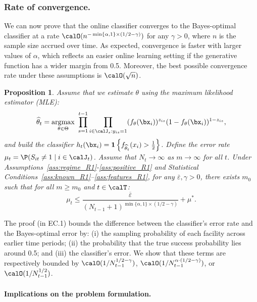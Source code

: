 \documentclass[11pt]{article}
\DeclareMathOperator*{\argmax}{argmax}
\newtheorem{proposition}{Proposition}[]
\begin{document}
\subsubsection*{Rate of convergence.}
We can now prove that the online classifier converges to the Bayes-optimal classifier at a rate $\calO(n^{-\min\{\alpha,1\}\times (1/2-\gamma)})$ for any $\gamma>0$, where $n$ is the sample size accrued over time. As expected, convergence is faster with larger values of $\alpha$, which reflects an easier online learning setting if the generative function has a wider margin from 0.5. Moreover, the best possible convergence rate under these assumptions is $\calO(\sqrt n)$.
\setcounter{proposition}{0}
\begin{proposition}\label{prop:MLE_R1}
       Assume that we estimate $\theta$ using the maximum likelihood estimator (MLE):
    \begin{equation}
        \widehat{\theta}_t= \argmax_{\theta\in\Theta} \ \prod_{s=1}^{t-1} \prod_{i\in\calJ_s:y_{is}=1} (f_\theta(\bx_{i}))^{z_{is}}(1-f_\theta(\bx_{i}))^{1-z_{is}}, \label{eq:mle_estimation_R1}
    \end{equation}
    and build the classifier
    $h_t(\bx_{i}) = \mathbf{1}\left\{f_{\widehat{\theta}_t}(x_{i})>\frac{1}{2}\right\}$. Define the error rate $\mu_t = \P(S_{it}\neq 1 \mid i\in\calJ_t)$. Assume that $N_t \to \infty$ as $m \to \infty$ for all $t$. Under Assumptions~\ref{ass:regime_R1}-\ref{ass:positive_R1} and Statistical Conditions~\ref{ass:known_R1}--\ref{ass:features_R1}, for any $\overline\varepsilon,\gamma>0$, there exists $m_0$ such that for all $m\geq m_0$ and $t\in\calT$:
    \[\mu_t \leq \frac{\overline\varepsilon}{(N_{t-1}+1)^{\min\{\alpha,1\}\times (1/2-\gamma)}}+\mu^*.\]
\end{proposition}

The proof (in EC.1) bounds the difference between the classifier's error rate and the Bayes-optimal error by: (i) the sampling probability of each facility across earlier time periods; (ii) the probability that the true success probability lies around 0.5; and (iii) the classifier's error. We show that these terms are respectively bounded by $\calO(1/N_{t-1}^{1/2-\gamma})$, $\calO(1/N_{t-1}^{\alpha\cdot(1/2-\gamma)})$, or $\calO(1/N_{t-1}^{1/2})$.

\paragraph{Implications on the problem formulation.}
\end{document}
